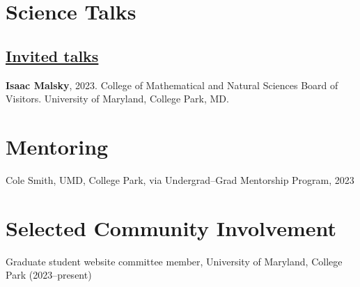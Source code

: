 \documentclass[letterpaper,11pt]{article}
\newcommand{\shorterSection}[1]{\vspace{-10pt}\section{#1}}
\newcommand{\shortershorterSection}[1]{\vspace{-10pt}\subsection{#1}}
\begin{document}
\shorterSection{Science Talks}
\vspace{12pt}
\shortershorterSection{\underline{Invited talks}}
\small
  \begin{list}{}{\cvlist}
  \item[{\color{numcolor}\scriptsize3}] \textbf{Isaac Malsky}, 2023. College of Mathematical and Natural Sciences Board of Visitors. University of Maryland, College Park, MD.
  \end{list}

\shorterSection{Mentoring}
\small
  \begin{list}{}{\cvlist}
  \item[{\color{numcolor}}]Cole Smith, UMD, College Park, via Undergrad--Grad Mentorship Program, 2023
  \end{list} 

 \shorterSection{Selected Community Involvement}
 \begin{list}{}{\cvlist}
 \item Graduate student website committee member, University of Maryland, College Park (2023--present)
 \end{list} 
\end{document}
